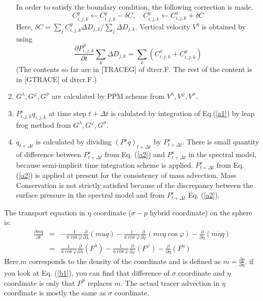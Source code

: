 \begin{enumerate}
  In order to satisfy the boundary condition, the following correction is made.
  \begin{equation}
    C^{y}_{i,j,k}\leftarrow C^{y}_{i,j,k}-\delta C, \quad C^{y}_{i,j,k}\leftarrow C^{x}_{i,j,k}+\delta C
  \end{equation}
  Here, $\delta C=\sum_{j}C^{y}_{i,j,k}\Delta D_{j,k}/\sum_{j}\Delta D_{j,k}$.
  Vertical velocity $V^{\eta}$ is obtained by using
  \begin{equation}
    \label{a2}
    \frac{\partial P^{S}_{i,j,k}}{\partial t}\sum_{k}\Delta D_{j,k}=\sum_{k}(C^{x}_{i,j,k}+C^{y}_{i,j,k})
  \end{equation}
  (The contents so far are in [TRACEG] of dtrcr.F.  The rest of the content is in [GTRACE] of dtrcr.F.)
\item $G^{\lambda}, G^{\varphi}, G^{\sigma}$ are calculated by PPM scheme from $V^{\lambda}, V^{\varphi}, V^{\sigma}$.

\item $P^{s}_{i,j,k}q_{i,j,k}$ at time step $t+\Delta t$ is calulated by integration of Eq.(\ref{a1}) by leap frog method from $G^{\lambda}, G^{\varphi}, G^{\sigma}$.

\item $q_{t+\Delta t}$ is calculated by dividing $(P^{s}q)_{t+\Delta t}$ by $P^{s}_{t+\Delta t}$.
  There is small quantity of difference between $P^{s}_{t+\Delta t}$ from Eq. (\ref{a2}) and $P^{s}_{t+\Delta t}$ in the spectral model, because semi-implicit time integration scheme is applied.
  $P^{s}_{t+\Delta t}$ from Eq. (\ref{a2}) is applied at present for the consistency of mass advection. Mass Conservation is not strictly satisfied because of the discrepancy between the surface pressure in the spectral model and from $P^{s}_{t+\Delta t}$ Eq. (\ref{a2}).
\end{enumerate}

The transport equation in $\eta$ coordinate ($\sigma-p$ hybrid coordinate) on the sphere is:
\begin{eqnarray}                                                             \frac{\partial mq}{\partial t} &=& - \frac{1}{a \cos \varphi} \frac{\partial}{\partial \lambda}(muq)- \frac{1}{a \cos \varphi} \frac{\partial}{\partial \varphi}(mvq \cos \varphi)- \frac{\partial}{\partial \eta} (m \dot{\eta} q)\\                                                                         &=& \frac{1}{a \cos \varphi} \frac{\partial}{\partial \lambda}(F^{\lambda})- \frac{1}{a \cos \varphi} \frac{\partial}{\partial \varphi}(F^{\varphi})-\frac{\partial}{\partial \eta} (F^{\eta})
\end{eqnarray}
Here,$m$ corresponds to the density of the coordinate and is defined as $m=\frac{\partial p}{\partial \eta}$.
if you look at Eq. (\ref{b1}), you can find that difference of $\sigma$ coordinate and $\eta$ coordinate is only that $P^{S}$ replaces $m$.
The actual tracer advection in $\eta$ coordinate is mostly the same as $\sigma$ coordinate.

